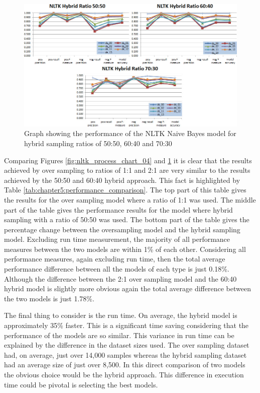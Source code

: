 \begin{figure}[htbp]
	\centering
	\includegraphics[width=1\textwidth]{Figures/Chapter5/nltk_process_chart_05.jpg}
	\caption[NLTK model performance using hybrid sampling]{Graph showing the performance of the NLTK Naive Bayes model for hybrid sampling ratios of 50:50, 60:40 and 70:30}
	\label{fig:nltk_process_chart_05}
\end{figure}

Comparing Figures \ref{fig:nltk_process_chart_04} and \ref{fig:nltk_process_chart_05} it is clear that the results achieved by over sampling to ratios of 1:1 and 2:1 are very similar to the results achieved by the 50:50 and 60:40 hybrid approach. This fact is highlighted by Table \ref{tab:chapter5:performance_comparison}. The top part of this table gives the results for the over sampling model where a ratio of 1:1 was used. The middle part of the table gives the performance results for the model where hybrid sampling with a ratio of 50:50 was used. The bottom part of the table gives the percentage change between the oversampling model and the hybrid sampling model. Excluding run time measurement, the majority of all performance measures between the two models are within 1\% of each other. Considering all performance measures, again excluding run time, then the total average performance difference between all the models of each type is just 0.18\%. Although the difference between the 2:1 over sampling model and the 60:40 hybrid model is slightly more obvious again the total average difference between the two models is just 1.78\%.

The final thing to consider is the run time. On average, the hybrid model is approximately 35\% faster. This is a significant time saving considering that the performance of the models are so similar. This variance in run time can be explained by the difference in the dataset sizes used. The over sampling dataset had, on average, just over 14,000 samples whereas the hybrid sampling dataset had an average size of just over 8,500. In this direct comparison of two models the obvious choice would be the hybrid approach. This difference in execution time could be pivotal is selecting the best models.

